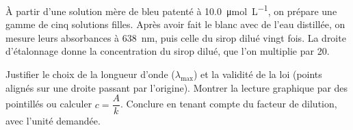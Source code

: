 \begin{experience}
À partir d'une solution mère de bleu patenté à \qty{10,0}{\micro mol.L^{-1}}, on prépare une gamme de cinq solutions filles. Après
avoir fait le blanc avec de l'eau distillée, on mesure leurs absorbances à \qty{638}{nm}, puis celle du sirop dilué vingt fois.
La droite d'étalonnage donne la concentration du sirop dilué, que l'on multiplie par 20.
\end{experience}
\begin{rediger}
Justifier le choix de la longueur d'onde ($\lambda_{\max}$) et la validité de la loi (points alignés sur une droite passant par
l'origine). Montrer la lecture graphique par des pointillés ou calculer $c=\dfrac{A}{k}$. Conclure en tenant compte du
facteur de dilution, avec l'unité demandée.
\end{rediger}
\exercices

